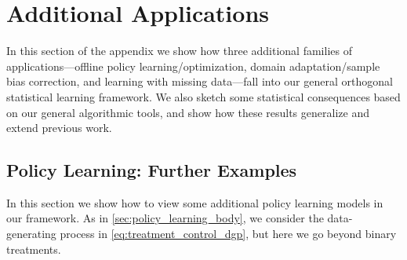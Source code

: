 \documentclass[11pt]{article} %
\newcommand{\pref}[1]{\cref{#1}}
\theoremstyle{theorem}  %
\theoremstyle{plain}
\begin{document}
%
%
%
%
 
\section{Additional Applications} 
\label{sec:applications}
%
%

%

In this section of the appendix we show how three additional families of applications---offline policy learning/optimization, domain adaptation/sample bias correction, and learning with missing data---fall into our general orthogonal statistical learning framework.  We also sketch some statistical consequences based on our general algorithmic tools, and show how these results generalize and extend previous work. 
%

%
%
%

\subsection{Policy Learning: Further Examples}\label{sec:policy}
In this section we show how to view some additional policy learning models in our framework. As in \pref{sec:policy_learning_body}, we consider the data-generating process in \pref{eq:treatment_control_dgp}, but here we go beyond binary treatments.
\end{document}
